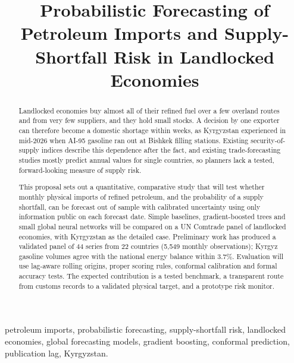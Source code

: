 \documentclass[conference]{IEEEtran}
\begin{document}
\title{Probabilistic Forecasting of Petroleum Imports and Supply-Shortfall Risk in Landlocked Economies}

\author{
}

\maketitle

\begin{abstract}
Landlocked economies buy almost all of their refined fuel over a few overland routes and from very few suppliers, and they hold small stocks. A decision by one exporter can therefore become a domestic shortage within weeks, as Kyrgyzstan experienced in mid-2026 when AI-95 gasoline ran out at Bishkek filling stations. Existing security-of-supply indices describe this dependence after the fact, and existing trade-forecasting studies mostly predict annual values for single countries, so planners lack a tested, forward-looking measure of supply risk.

This proposal sets out a quantitative, comparative study that will test whether monthly physical imports of refined petroleum, and the probability of a supply shortfall, can be forecast out of sample with calibrated uncertainty using only information public on each forecast date. Simple baselines, gradient-boosted trees and small global neural networks will be compared on a UN Comtrade panel of landlocked economies, with Kyrgyzstan as the detailed case. Preliminary work has produced a validated panel of 44 series from 22 countries (5,549 monthly observations); Kyrgyz gasoline volumes agree with the national energy balance within 3.7\%. Evaluation will use lag-aware rolling origins, proper scoring rules, conformal calibration and formal accuracy tests. The expected contribution is a tested benchmark, a transparent route from customs records to a validated physical target, and a prototype risk monitor.
\end{abstract}

\begin{IEEEkeywords}
petroleum imports, probabilistic forecasting, supply-shortfall risk, landlocked economies, global forecasting models, gradient boosting, conformal prediction, publication lag, Kyrgyzstan.
\end{IEEEkeywords}
\end{document}
